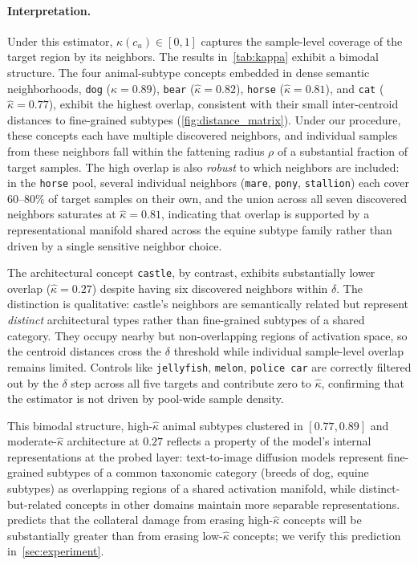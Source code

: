 \paragraph{Interpretation.}
Under this estimator, $\hat\kappa(c_u) \in [0, 1]$ captures the sample-level  coverage of the target region by its neighbors. The results in~\cref{tab:kappa} exhibit a bimodal structure. The four animal-subtype concepts embedded in dense semantic neighborhoods, \texttt{dog} ($\hat\kappa = 0.89$), \texttt{bear} ($\hat\kappa = 0.82$), \texttt{horse} ($\hat\kappa = 0.81$), and \texttt{cat} ($\hat\kappa = 0.77$), exhibit the  highest overlap, consistent with their small inter-centroid distances to fine-grained subtypes (\cref{fig:distance_matrix}). 
Under our procedure, these concepts each have multiple discovered neighbors, and individual samples from these neighbors fall within the fattening radius $\rho$ of a substantial fraction of target samples. The high overlap is also \emph{robust} to which neighbors are included: in the \texttt{horse} pool, several individual neighbors (\texttt{mare}, \texttt{pony}, \texttt{stallion}) each cover 60--80\% of target samples on their own, and the union across all seven discovered neighbors saturates at $\hat\kappa = 0.81$, indicating that overlap is supported by a representational manifold shared across the equine subtype family rather than driven by a single sensitive neighbor choice.

The architectural concept \texttt{castle}, by contrast, exhibits substantially lower overlap ($\hat\kappa = 0.27$) despite having six discovered neighbors within $\delta$. The distinction is qualitative: castle's neighbors are semantically related but represent \emph{distinct} architectural types rather than fine-grained subtypes of a shared category. They occupy nearby but non-overlapping regions of activation space, so the centroid distances cross the $\delta$ threshold while individual sample-level overlap remains limited. Controls like \texttt{jellyfish}, \texttt{melon}, \texttt{police car} are correctly filtered out by the $\delta$ step across all five targets and contribute zero to $\hat\kappa$, confirming that the estimator is not driven by pool-wide sample density.

This bimodal structure, high-$\hat\kappa$ animal subtypes clustered in $[0.77, 0.89]$ and moderate-$\hat\kappa$ architecture at $0.27$ reflects a property of the model's internal representations at the probed layer: text-to-image diffusion models represent fine-grained subtypes of a common taxonomic category (breeds of dog, equine subtypes) as overlapping regions of a shared activation manifold, while distinct-but-related concepts in other domains maintain more separable representations.  predicts that the collateral damage from erasing high-$\hat\kappa$ concepts will be substantially greater than from erasing low-$\hat\kappa$ concepts; we verify this prediction in~\cref{sec:experiment}.

